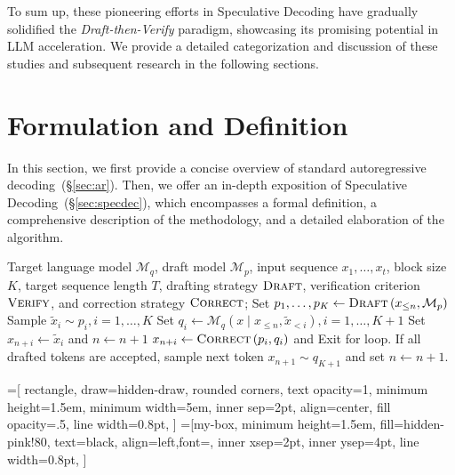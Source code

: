 To sum up, these pioneering efforts in Speculative Decoding have gradually solidified the \textit{Draft-then-Verify} paradigm, showcasing its promising potential in LLM acceleration. We provide a detailed categorization and discussion of these studies and subsequent research in the following sections.

\section{Formulation and Definition}
\label{sec:definition}
In this section, we first provide a concise overview of standard autoregressive decoding~(\S\ref{sec:ar}). Then, we offer an in-depth exposition of Speculative Decoding~(\S\ref{sec:specdec}), which encompasses a formal definition, a comprehensive description of the methodology, and a detailed elaboration of the algorithm.

\begin{algorithm}[t]
\small
\caption{Speculative Decoding}
\label{algo:specdec}
\begin{algorithmic}[1]
\Require
Target language model $\mathcal{M}_q$, draft model $\mathcal{M}_p$, input sequence $x_1, \dots, x_t$, block size $K$, target sequence length $T$, drafting strategy $\textsc{Draft}$, verification criterion $\textsc{Verify}$, and correction strategy $\textsc{Correct}$;
\textcolor[RGB]{64,101,149}{}
\State Set $p_1, \dots, p_K \gets \textsc{Draft}\left(x_{\leq n}, \mathcal{M}_p\right)$
\textcolor[RGB]{64,101,149}{}
\State Sample $\widetilde{x}_i \sim p_i, i=1, \dots, K$
\textcolor[RGB]{64,101,149}{}
\State Set $q_{i} \gets \mathcal{M}_q\left(x\mid x_{\leq n}, \widetilde{x}_{<i}\right), i=1, \dots, K+1$
\textcolor[RGB]{64,101,149}{}
\State Set ${x}_{n+i} \gets\widetilde{x}_i$ and $n \gets n + 1$
\Else
\State ${x}_{n+i} \gets \textsc{Correct}\left(p_{i}, q_{i}\right)$
\State and Exit for loop.
\EndIf
\EndFor \State If all drafted tokens are accepted, sample next token ${x}_{n+1} \sim q_{K+1}$ and set $n \gets n + 1$.
\EndWhile
\end{algorithmic}
\end{algorithm}

=[
    rectangle,
    draw=hidden-draw, rounded corners, text opacity=1, minimum height=1.5em, minimum width=5em, inner sep=2pt, align=center, fill opacity=.5, line width=0.8pt, ]
=[my-box, minimum height=1.5em, fill=hidden-pink!80, text=black, align=left,font=\normalsize,
    inner xsep=2pt, inner ysep=4pt, line width=0.8pt, ]

